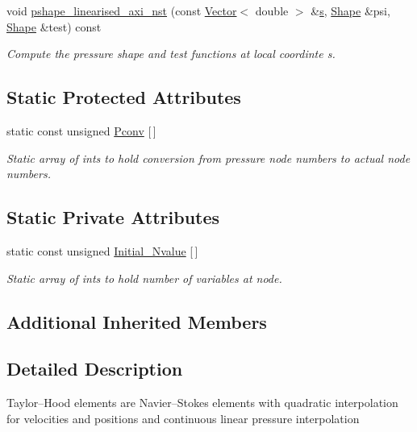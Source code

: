 \begin{DoxyCompactItemize}
void \hyperlink{classoomph_1_1LinearisedAxisymmetricQTaylorHoodElement_ab8e94bf4d8ad2e64e85b6c12bac90a8f}{pshape\+\_\+linearised\+\_\+axi\+\_\+nst} (const \hyperlink{classoomph_1_1Vector}{Vector}$<$ double $>$ \&\hyperlink{cfortran_8h_ab7123126e4885ef647dd9c6e3807a21c}{s}, \hyperlink{classoomph_1_1Shape}{Shape} \&psi, \hyperlink{classoomph_1_1Shape}{Shape} \&test) const
\begin{DoxyCompactList}\small\item\em Compute the pressure shape and test functions at local coordinte s. \end{DoxyCompactList}\end{DoxyCompactItemize}
\subsection*{Static Protected Attributes}
\begin{DoxyCompactItemize}
\item 
static const unsigned \hyperlink{classoomph_1_1LinearisedAxisymmetricQTaylorHoodElement_a0ec7df0c93672025bf62d172667f23a4}{Pconv} \mbox{[}$\,$\mbox{]}
\begin{DoxyCompactList}\small\item\em Static array of ints to hold conversion from pressure node numbers to actual node numbers. \end{DoxyCompactList}\end{DoxyCompactItemize}
\subsection*{Static Private Attributes}
\begin{DoxyCompactItemize}
\item 
static const unsigned \hyperlink{classoomph_1_1LinearisedAxisymmetricQTaylorHoodElement_aca39ac2e70b5a8f343e081eecd9d4604}{Initial\+\_\+\+Nvalue} \mbox{[}$\,$\mbox{]}
\begin{DoxyCompactList}\small\item\em Static array of ints to hold number of variables at node. \end{DoxyCompactList}\end{DoxyCompactItemize}
\subsection*{Additional Inherited Members}


\subsection{Detailed Description}
Taylor--Hood elements are Navier--Stokes elements with quadratic interpolation for velocities and positions and continuous linear pressure interpolation 

